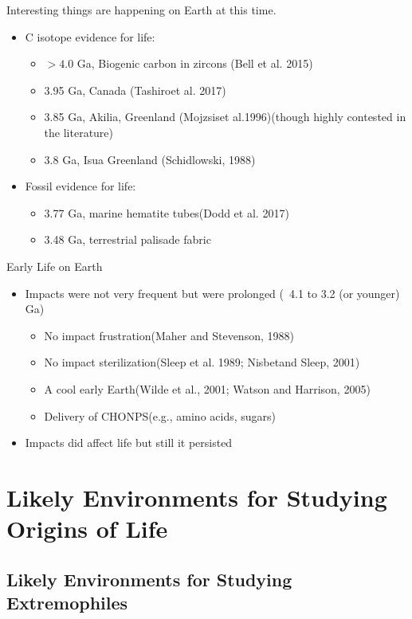\documentclass[]{article}
\begin{document}
Interesting things are happening on Earth at this time.

\begin{itemize}
	\item C isotope evidence for life:
	\begin{itemize}
		\item  $>4.0$ Ga, Biogenic carbon in zircons (Bell et al. 2015)
		\item 3.95 Ga, Canada (Tashiroet al. 2017)
		\item 3.85 Ga, Akilia, Greenland (Mojzsiset al.1996)(though highly contested in the literature)
		\item 3.8 Ga, Isua Greenland (Schidlowski, 1988)
	\end{itemize}
	\item Fossil evidence for life: 
	\begin{itemize}
		\item 3.77 Ga, marine hematite tubes(Dodd et al. 2017)
		\item 3.48 Ga, terrestrial palisade fabric
	\end{itemize}
\end{itemize}

Early Life on Earth

\begin{itemize}
	\item Impacts were not very frequent but were prolonged (~4.1 to 3.2 (or younger) Ga)
	\begin{itemize}
		\item No impact frustration(Maher and Stevenson, 1988)
		\item No impact sterilization(Sleep et al. 1989; Nisbetand Sleep, 2001)
		\item A cool early Earth(Wilde et al., 2001; Watson and Harrison, 2005)
		\item Delivery of CHONPS(e.g., amino acids, sugars)
	\end{itemize}
	\item Impacts did affect life but still it persisted
\end{itemize}

\section{Likely Environments for Studying Origins of Life}

\subsection{Likely Environments for Studying Extremophiles}
\end{document}
